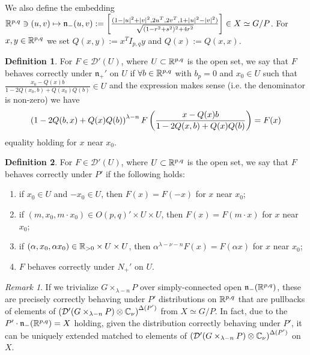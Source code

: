 \documentclass[10pt]{article} %
\newcommand{\D}{\mathcal{D}}
\theoremstyle{definition}
\newtheorem{mydef}{Definition}[section]
\theoremstyle{remark}
\newtheorem*{remark}{Remark}
\begin{document}
We also define the embedding $\mathbb{R}^{ p,q }\ni(u,v)\mapsto \mathfrak{n}_-(u,v):=\left[\frac{
	(1-\left| u \right|^2+\left| v \right|^2,2u^T,2v^T,1+\left| u \right|^2
	-\left| v \right|^2)}{\sqrt{(1-r^2+s^2)^2+4r^2}}\right]\in X\simeq G/P$.
	For $x,y\in\mathbb{R}^{ p,q }$
	we set $Q(x,y):=x^TI_{ p,q }y$ and $Q(x):=Q(x,x)$.
	\begin{mydef}
			 For $F\in\D'(U)$, where $U\subset\mathbb{R}^{ p,q }$ is the open set, we say that
				$F$ behaves correctly under $\mathfrak{n}_+'$ on $U$ if
				$\forall b\in\mathbb{R}^{ p,q }$ with $b_p=0$ and $x_0\in U$ such that
				$\frac{ x_0-Q(x)b }{ 1-2Q(x_0,b)+Q(x_0)Q(b) }\in U$ and the expression makes sense (i.e. 
				the denominator is non-zero) we have \[\left( 1-2Q(b,x)+Q(x)Q(b) \right)^{ \lambda-n }F
				\left(\frac{ x-Q(x)b }{ 1-2Q(x,b)+Q(x)Q(b)}\right)=F(x)\] equality holding for $x$ near $x_0$.
	\end{mydef}
	\begin{mydef}
			 For $F\in\D'(U)$, where $U\subset\mathbb{R}^{ p,q }$ is the open set,
				we say that $F$ behaves correctly under $P'$ if the following holds:
				\begin{enumerate}
					\item if $x_0\in U$ and $-x_0\in U$, then $F(x)=F(-x)$ for $x$ near $x_0$;
					\item if $(m,x_0,m\cdot x_0)\in O(p,q)'\times U\times U$, then $F(x)=F(m\cdot x)$ for
						$x$ near $x_0$;
					\item if $(\alpha,x_0,\alpha x_0)\in \mathbb{R}_{>0}\times U\times U$, then $\alpha^{
						\lambda-\nu-n}F(x)=F(\alpha x)$ for $x$ near $x_0$;
					\item $F$ behaves correctly under $N_+'$ on $U$.
				\end{enumerate}
	\end{mydef}
	\begin{remark}
		If we trivialize $G\times_{\lambda-n}P$ over simply-connected open $\mathfrak{n}_-(\mathbb{R}^{p,q})$,
		these are precisely correctly behaving under $P'$
		distributions on $\mathbb{R}^{ p,q }$ that are pullbacks of elements of 
		$\mybra{\D'(G\times_{\lambda-n} P)\otimes\C_\nu}^{\Delta(P')}$
		from $X\simeq G/P$.
		In fact, due to the $P'\cdot\mathfrak{n}_-(\mathbb{R}^{ p,q })=X$ holding, given the
		distribution correctly behaving under $P'$, it can be uniquely extended matched to elements of
		$\mybra{\D'(G\times_{\lambda-n} P)\otimes\C_\nu}^{\Delta(P')}$
		on $X$.
	\end{remark}
\end{document}
